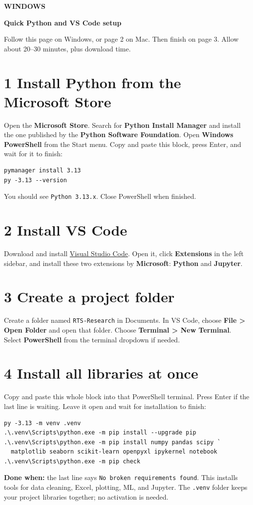 \documentclass[11pt,letterpaper]{article}
\newcommand{\heading}[2]{{\small\color{accent}\textbf{#1}}\par{\LARGE\bfseries #2}\par}
\begin{document}
\sloppy
\heading{WINDOWS}{Quick Python and VS Code setup}
Follow this page on Windows, or page 2 on Mac. Then finish on page 3.
Allow about 20--30 minutes, plus download time.

\section*{1 \quad Install Python from the Microsoft Store}
Open the \textbf{Microsoft Store}. Search for \textbf{Python Install Manager}
and install the one published by the \textbf{Python Software Foundation}.
Open \textbf{Windows PowerShell} from the Start menu. Copy and paste this
block, press Enter, and wait for it to finish:
\begin{lstlisting}
pymanager install 3.13
py -3.13 --version
\end{lstlisting}
You should see \texttt{Python 3.13.x}. Close PowerShell when finished.

\section*{2 \quad Install VS Code}
Download and install \href{https://code.visualstudio.com/Download}{Visual Studio Code}.
Open it, click \textbf{Extensions} in the left sidebar, and install these two
extensions by \textbf{Microsoft}: \textbf{Python} and \textbf{Jupyter}.

\section*{3 \quad Create a project folder}
Create a folder named \texttt{RTS-Research} in Documents.
In VS Code, choose \textbf{File > Open Folder} and open that folder.
Choose \textbf{Terminal > New Terminal}. Select \textbf{PowerShell}
from the terminal dropdown if needed.

\section*{4 \quad Install all libraries at once}
Copy and paste this whole block into that PowerShell terminal. Press Enter
if the last line is waiting. Leave it open and wait for installation to finish:
\begin{lstlisting}
py -3.13 -m venv .venv
.\.venv\Scripts\python.exe -m pip install --upgrade pip
.\.venv\Scripts\python.exe -m pip install numpy pandas scipy `
  matplotlib seaborn scikit-learn openpyxl ipykernel notebook
.\.venv\Scripts\python.exe -m pip check
\end{lstlisting}
\textbf{Done when:} the last line says \texttt{No broken requirements found}.
This installs tools for data cleaning, Excel, plotting, ML, and Jupyter.
The \texttt{.venv} folder keeps your project libraries together; no activation is needed.
\end{document}
